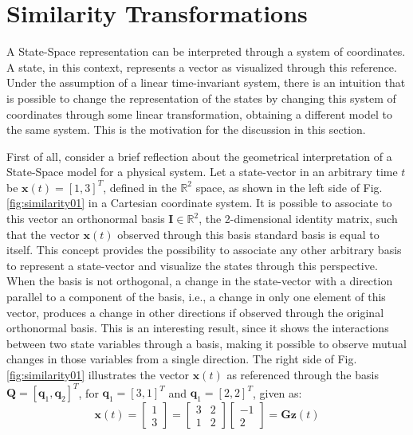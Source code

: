 \documentclass[a4paper,11pt]{book}
\numberwithin{figure}{chapter}
\numberwithin{equation}{chapter}
\numberwithin{table}{chapter}
\theoremstyle{definition}
\begin{document}
\section{Similarity Transformations}

A State-Space representation can be interpreted through a system of coordinates. A state, in this context, represents a vector as visualized through this reference. Under the assumption of a linear time-invariant system, there is an intuition that is possible to change the representation of the states by changing this system of coordinates through some linear transformation, obtaining a different model to the same system. This is the motivation for the discussion in this section.

First of all, consider a brief reflection about the geometrical interpretation of a State-Space model for a physical system. Let a state-vector in an arbitrary time $t$ be $\bm{x}(t) = [1, 3]^T$, defined in the $\mathbb{R}^{2}$ space, as shown in the left side of Fig. \ref{fig:similarity01} in a Cartesian coordinate system. It is possible to associate to this vector an orthonormal basis $\bm{I} \in \mathbb{R}^2$, the 2-dimensional identity matrix, such that the vector $\bm{x}(t)$ observed through this basis standard basis is equal to itself. This concept provides the possibility to associate any other arbitrary basis to represent a state-vector and visualize the states through this perspective. When the basis is not orthogonal, a change in the state-vector with a direction parallel to a component of the basis, i.e., a change in only one element of this vector, produces a change in other directions if observed through the original orthonormal basis. This is an interesting result, since it shows the interactions between two state variables through a basis, making it possible to observe mutual changes in those variables from a single direction. The right side of Fig. \ref{fig:similarity01} illustrates the vector $\bm{x}(t)$ as referenced through the basis $\bm{Q} = [\bm{q}_1, \bm{q}_2]^T$, for $\bm{q}_1 = [3, 1]^T$ and $\bm{q}_1 = [2, 2]^T$, given as: 
\begin{equation}
	\bm{x}(t) = \begin{bmatrix} 1 \\ 3 \end{bmatrix} = \begin{bmatrix} 3 & 2 \\ 1 & 2 \end{bmatrix} \begin{bmatrix} -1 \\ 2 \end{bmatrix} = \bm{G}\bm{z}(t)
\end{equation}
\end{document}
